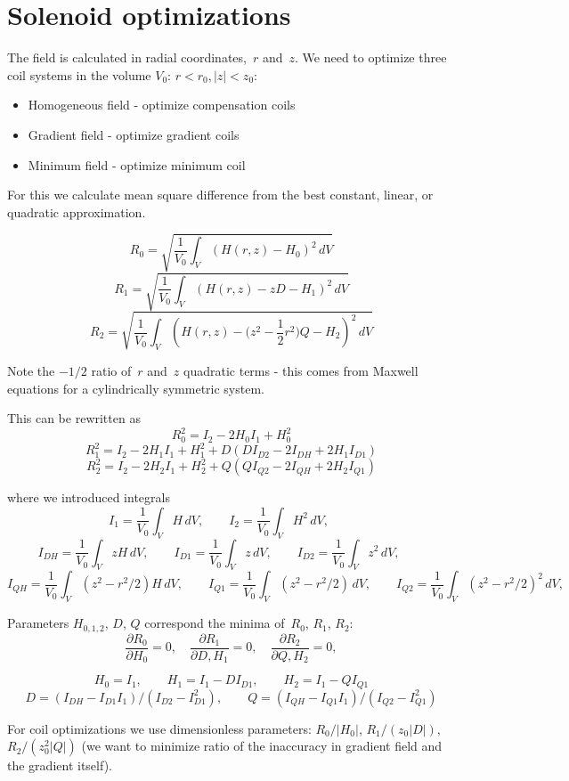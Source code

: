 \documentclass[a4paper]{article}
\begin{document}
\section {Solenoid optimizations}

The field is calculated in radial coordinates,~$r$ and~$z$.
We need to optimize three coil systems in the volume $V_0$: $r<r_0, |z|<z_0$:
\begin{itemize}
\item Homogeneous field - optimize compensation coils
\item Gradient field - optimize gradient coils
\item Minimum field - optimize minimum coil
\end{itemize}
For this we calculate mean square difference from the best
constant, linear, or quadratic approximation.

$$ R_0 = \sqrt{\frac{1}{V_0}\int_V(H(r,z) - H_0)^2\,dV}
$$
$$ R_1 = \sqrt{\frac{1}{V_0}\int_V(H(r,z) - z D - H_1)^2\,dV}
$$
$$ R_2 = \sqrt{\frac{1}{V_0}\int_V(H(r,z) - \Big(z^2-\frac12 r^2\Big) Q - H_2)^2\,dV}
$$

Note the $-1/2$ ratio of~$r$ and~$z$ quadratic terms - this comes from Maxwell equations
for a cylindrically symmetric system.


This can be rewritten as
$$ R_0^2
= I_2 - 2H_0 I_1 + H_0^2
$$
$$ R_1^2
 = I_2 - 2H_1 I_1 + H_1^2 + D( D I_{D2} - 2I_{DH} + 2H_1 I_{D1})
$$
$$ R_2^2
 = I_2 - 2H_2 I_1 + H_2^2 + Q( Q I_{Q2}  - 2I_{QH} + 2H_2 I_{Q1})
$$



where we introduced integrals
$$
I_1 = \frac{1}{V_0}\int_V H\, dV,\qquad
I_2 = \frac{1}{V_0}\int_V H^2\, dV,\qquad
$$
$$
I_{DH} = \frac{1}{V_0}\int_V z   H\, dV,\qquad
I_{D1} = \frac{1}{V_0}\int_V z  \, dV,\qquad
I_{D2} = \frac{1}{V_0}\int_V z^2\, dV,\qquad
$$
$$
I_{QH} = \frac{1}{V_0}\int_V (z^2-r^2/2)H\, dV,\qquad
I_{Q1} = \frac{1}{V_0}\int_V (z^2-r^2/2)\, dV,\qquad
I_{Q2} = \frac{1}{V_0}\int_V (z^2-r^2/2)^2\, dV,\qquad
$$

Parameters $H_{0,1,2}$, $D$, $Q$ correspond the minima of~$R_0$, $R_1$, $R_2$:
$$
\frac{\partial R_0}{\partial H_0} = 0,\quad
\frac{\partial R_1}{\partial D, H_1} = 0,\quad
\frac{\partial R_2}{\partial Q, H_2} = 0,
$$

$$
H_0 = I_1,\qquad
H_1 = I_1 - D I_{D1},\qquad
H_2 = I_1 - Q I_{Q1}
$$
$$
D = (I_{DH} - I_{D1} I_1)/(I_{D2} - I_{D1}^2),\qquad
Q = (I_{QH} - I_{Q1} I_1)/(I_{Q2} - I_{Q1}^2)
$$

For coil optimizations we use dimensionless parameters:
$R_0/|H_0|$, $R_1/(z_0|D|)$, $R_2/(z_0^2|Q|)$ (we want to minimize ratio
of the inaccuracy in gradient field and the gradient itself).
\end{document}
